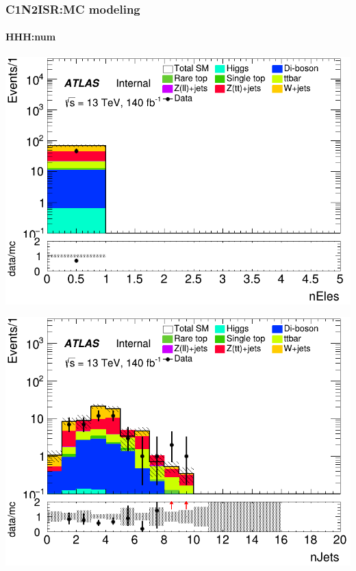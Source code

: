 \documentclass[usenames,dvipsnames]{beamer}
\begin{document}
\begin{frame}
\frametitle{C1N2ISR:MC modeling}
\framesubtitle{HHH:\quad num}
    \begin{minipage}{0.32\textwidth}
        \centering
        \includegraphics[width=\textwidth]{graphics/HHH_met/HHH_met_nEles.png}
    \end{minipage}
    \hfill
    \begin{minipage}{0.32\textwidth}
        \centering
        \includegraphics[width=\textwidth]{graphics/HHH_met/HHH_met_nJets.png}
    \end{minipage}
    \hfill
    \begin{minipage}{0.32\textwidth}
        \centering

\end{minipage}
\end{frame}
\end{document}
